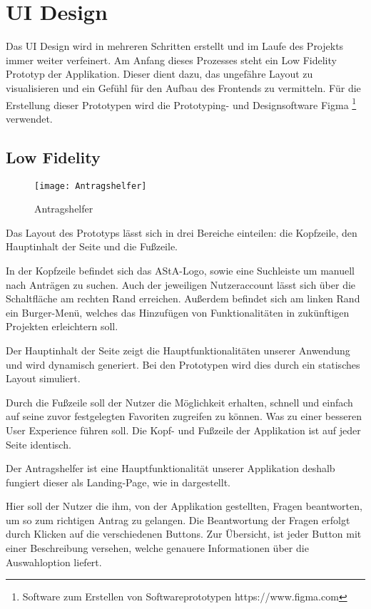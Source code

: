 \chapter{UI Design}\label{ch:ui-design}
Das UI Design wird in mehreren Schritten erstellt und im Laufe des Projekts immer weiter
verfeinert. Am Anfang dieses Prozesses steht ein Low Fidelity Prototyp der Applikation.
Dieser dient dazu, das ungefähre Layout zu visualisieren und ein Gefühl für den Aufbau
des Frontends zu vermitteln. %
Für die Erstellung dieser Prototypen wird die Prototyping- und
Designsoftware Figma \footnote{Software zum Erstellen von Softwareprototypen https://www.figma.com} verwendet.

\section{Low Fidelity}\label{Low Fidelity}
\begin{figure}[h]
  \centering
    \texttt{[image: Antragshelfer]}
    \caption{Antragshelfer}\label{Antragshelfer}
\end{figure}
Das Layout des Prototyps lässt sich in drei Bereiche einteilen:
die Kopfzeile, den Hauptinhalt der Seite und die Fußzeile.

In der Kopfzeile befindet sich das \ac{AStA}-Logo, sowie eine Suchleiste um manuell nach
Anträgen zu suchen.
Auch der jeweiligen Nutzeraccount lässt sich über die Schaltfläche
am rechten Rand erreichen.
Außerdem befindet sich am linken Rand ein Burger-Menü,
welches das Hinzufügen von Funktionalitäten in zukünftigen Projekten erleichtern soll.

Der Hauptinhalt der Seite zeigt die Hauptfunktionalitäten unserer Anwendung und wird 
dynamisch generiert. Bei den Prototypen wird dies
durch ein statisches Layout simuliert.

Durch die Fußzeile soll der Nutzer die Möglichkeit erhalten, schnell und einfach auf
seine zuvor festgelegten Favoriten zugreifen zu können.
Was zu einer besseren User Experience führen soll.
Die Kopf- und Fußzeile der Applikation ist auf jeder Seite identisch.

Der Antragshelfer ist eine Hauptfunktionalität unserer Applikation deshalb fungiert
dieser als Landing-Page, wie in  dargestellt.

Hier soll der Nutzer die ihm, von der Applikation gestellten, Fragen beantworten,
um so zum richtigen Antrag zu gelangen. %
Die Beantwortung der Fragen erfolgt durch Klicken auf die verschiedenen Buttons. %
Zur Übersicht, ist jeder Button mit einer Beschreibung versehen, welche genauere Informationen über die Auswahloption liefert.

